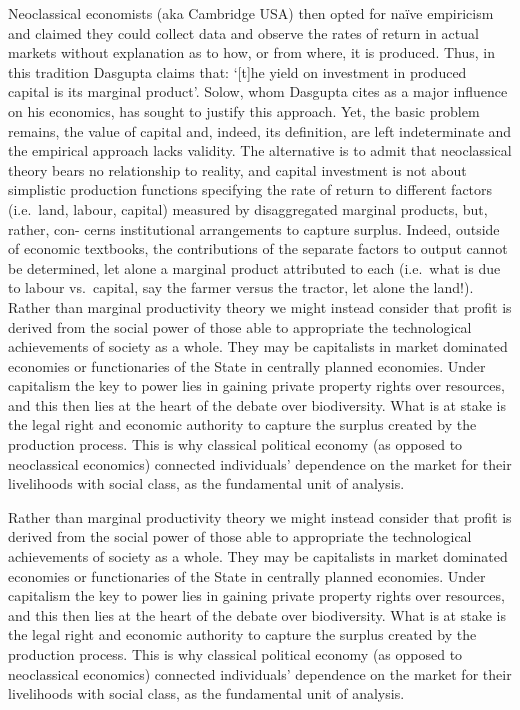 \documentclass[
]{book}
\begin{document}
Neoclassical economists (aka Cambridge USA) then opted for naïve empiricism and claimed
they could collect data and observe the rates of return in actual markets without explanation as
to how, or from where, it is produced. Thus, in this tradition Dasgupta claims
that: `{[}t{]}he yield on investment in produced capital is its marginal product'. Solow, whom Dasgupta
cites as a major influence on his economics, has sought to justify this approach.
Yet, the basic problem remains, the value of capital and, indeed, its
definition, are left indeterminate and the empirical approach lacks validity.
The alternative is to admit that neoclassical theory bears no relationship to reality, and capital
investment is not about simplistic production functions specifying the rate of return to different
factors (i.e.~land, labour, capital) measured by disaggregated marginal products, but, rather, con-
cerns institutional arrangements to capture surplus. Indeed, outside of economic textbooks, the
contributions of the separate factors to output cannot be determined, let alone a marginal product
attributed to each (i.e.~what is due to labour vs.~capital, say the farmer versus the tractor, let alone
the land!). Rather than marginal productivity theory we might instead consider that profit is
derived from the social power of those able to appropriate the technological achievements of society
as a whole. They may be capitalists in market dominated economies or functionaries of the State in
centrally planned economies. Under capitalism the key to power lies in gaining private property
rights over resources, and this then lies at the heart of the debate over biodiversity. What is at
stake is the legal right and economic authority to capture the surplus created by the production
process. This is why classical political economy (as opposed to neoclassical economics) connected
individuals' dependence on the market for their livelihoods with social class, as the fundamental
unit of analysis.

Rather than marginal productivity theory we might instead consider that profit is
derived from the social power of those able to appropriate the technological achievements of society
as a whole. They may be capitalists in market dominated economies or functionaries of the State in
centrally planned economies. Under capitalism the key to power lies in gaining private property
rights over resources, and this then lies at the heart of the debate over biodiversity. What is at
stake is the legal right and economic authority to capture the surplus created by the production
process. This is why classical political economy (as opposed to neoclassical economics) connected
individuals' dependence on the market for their livelihoods with social class, as the fundamental
unit of analysis.
\end{document}

